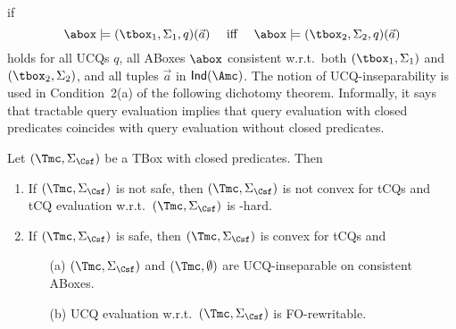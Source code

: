 \documentclass{lmcs}
\theoremstyle{definition}
\begin{document}
if 
  \[\abox\models 
  (\tbox_{1},\Sigma_{1},q)(\vec{a})\quad \text{ iff 
  }  \quad
  \abox\models(\tbox_{2},\Sigma_{2},q)(\vec{a})\]
  holds for all UCQs $q$, all ABoxes $\abox$ consistent w.r.t.\ both
  $(\tbox_{1},\Sigma_{1})$ and $(\tbox_{2},\Sigma_{2})$, and all
  tuples $\vec{a}$ in ${\sf Ind}(\Amc)$. The notion of
  UCQ-inseparability is used in Condition~2(a) of the following
  dichotomy theorem. Informally, it says that tractable query
  evaluation implies that query evaluation with closed predicates
  coincides with query evaluation without closed predicates.
\begin{thm}\label{thm:dlliter_dichotomy}
Let $(\Tmc,\Sigma_{\Csf})$ be a \dlliter TBox with closed predicates.
Then
\begin{enumerate}
\item If $(\Tmc,\Sigma_{\Csf})$ is not safe, then $(\Tmc,\Sigma_{\Csf})$ is not convex for tCQs and tCQ evaluation
w.r.t.~$(\Tmc,\Sigma_{\Csf})$ is \conp-hard.
\item If $(\Tmc,\Sigma_{\Csf})$ is safe, then $(\Tmc,\Sigma_{\Csf})$ is convex for tCQs and
\begin{itemize}
\item[(a)] $(\Tmc,\Sigma_{\Csf})$ and $(\Tmc,\emptyset)$ are UCQ-inseparable on consistent ABoxes.
\item[(b)] UCQ evaluation w.r.t.~$(\Tmc,\Sigma_{\Csf})$ is FO-rewritable.
\end{itemize}
\end{enumerate}
\end{thm}
\end{document}
